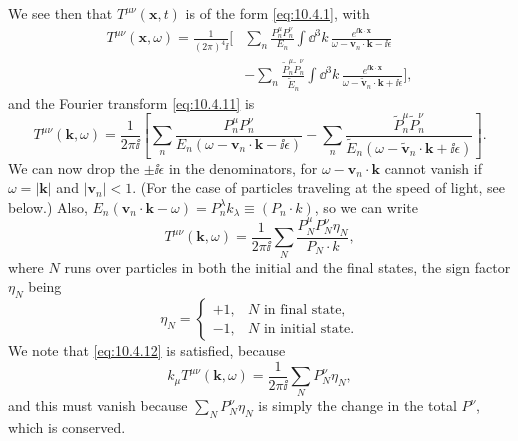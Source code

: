 We see then that \(T^{\mu\nu}(\mathbf{x},t)\) is of the form
\eqref{eq:10.4.1}, with
\begin{align*}
  T^{\mu\nu}(\mathbf{x},\omega)
  =\frac{1}{(2\pi)^4\ii}\Biggl[
  &\sum_n\frac{P_n^\mu P_n^\nu}{E_n}
  \int \dd^3k\,
  \frac{e^{\ii\mathbf{k}\cdot\mathbf{x}}}
       {\omega-\mathbf{v}_n\cdot\mathbf{k}-\ii\epsilon}\\
  &-\sum_n\frac{\widetilde P_n^\mu\widetilde P_n^\nu}{\widetilde E_n}
  \int \dd^3k\,
  \frac{e^{\ii\mathbf{k}\cdot\mathbf{x}}}
       {\omega-\widetilde{\mathbf{v}}_n\cdot\mathbf{k}
        +\ii\epsilon}
  \Biggr],
\end{align*}
and the Fourier transform \eqref{eq:10.4.11} is
\[
  T^{\mu\nu}(\mathbf{k},\omega)
  =
  \frac{1}{2\pi\ii}
  \left[
    \sum_n\frac{P_n^\mu P_n^\nu}
    {E_n(\omega-\mathbf{v}_n\cdot\mathbf{k}-\ii\epsilon)}
    -
    \sum_n\frac{\widetilde P_n^\mu\widetilde P_n^\nu}
    {\widetilde E_n
      (\omega-\widetilde{\mathbf{v}}_n\cdot\mathbf{k}+\ii\epsilon)}
  \right].
\]
We can now drop the \(\pm\ii\epsilon\) in the denominators, for
\(\omega-\mathbf{v}_n\cdot\mathbf{k}\) cannot vanish if
\(\omega=\lvert\mathbf{k}\rvert\) and
\(\lvert\mathbf{v}_n\rvert<1\). (For the case of particles traveling at
the speed of light, see below.) Also,
\(E_n(\mathbf{v}_n\cdot\mathbf{k}-\omega)
=P_n^\lambda k_\lambda\equiv(P_n\cdot k)\), so we can write
\begin{equation}
  T^{\mu\nu}(\mathbf{k},\omega)
  =
  \frac{1}{2\pi\ii}
  \sum_N
  \frac{P_N^\mu P_N^\nu\eta_N}{P_N\cdot k},
  \tag{10.4.21}\label{eq:10.4.21}
\end{equation}
where \(N\) runs over particles in both the initial and the final states,
the sign factor \(\eta_N\) being
\[
  \eta_N=
  \begin{cases}
  +1,&N\text{ in final state},\\
  -1,&N\text{ in initial state}.
  \end{cases}
\]
We note that \eqref{eq:10.4.12} is satisfied, because
\[
  k_\mu T^{\mu\nu}(\mathbf{k},\omega)
  =
  \frac{1}{2\pi\ii}\sum_NP_N^\nu\eta_N,
\]
and this must vanish because \(\sum_NP_N^\nu\eta_N\) is simply the change
in the total \(P^\nu\), which is conserved.


